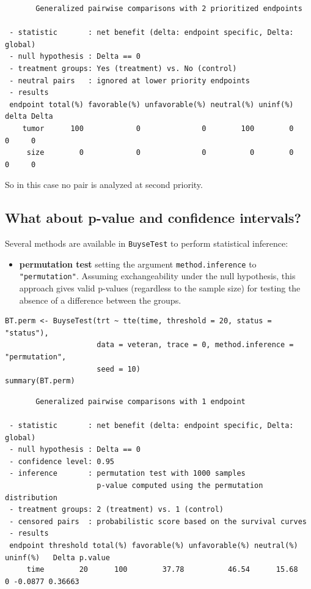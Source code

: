 \documentclass[12pt]{article}
\begin{document}
\begin{verbatim}
       Generalized pairwise comparisons with 2 prioritized endpoints

 - statistic       : net benefit (delta: endpoint specific, Delta: global) 
 - null hypothesis : Delta == 0 
 - treatment groups: Yes (treatment) vs. No (control) 
 - neutral pairs   : ignored at lower priority endpoints
 - results
 endpoint total(%) favorable(%) unfavorable(%) neutral(%) uninf(%) delta Delta
    tumor      100            0              0        100        0     0     0
     size        0            0              0          0        0     0     0
\end{verbatim}

So in this case no pair is analyzed at second priority.

\clearpage

\subsection{What about p-value and confidence intervals?}
\label{sec:org1fc7a9e}

Several methods are available in \texttt{BuyseTest} to perform statistical inference:
\begin{itemize}
\item \textbf{permutation test} setting the argument \texttt{method.inference} to
\texttt{"permutation"}. Assuming exchangeability under the null hypothesis,
this approach gives valid p-values (regardless to the sample size)
for testing the absence of a difference between the groups.
\end{itemize}
\lstset{language=r,label= ,caption= ,captionpos=b,numbers=none}
\begin{lstlisting}
BT.perm <- BuyseTest(trt ~ tte(time, threshold = 20, status = "status"),
                     data = veteran, trace = 0, method.inference = "permutation",
                     seed = 10) 
summary(BT.perm)
\end{lstlisting}

\begin{verbatim}
       Generalized pairwise comparisons with 1 endpoint

 - statistic       : net benefit (delta: endpoint specific, Delta: global) 
 - null hypothesis : Delta == 0 
 - confidence level: 0.95 
 - inference       : permutation test with 1000 samples 
                     p-value computed using the permutation distribution 
 - treatment groups: 2 (treatment) vs. 1 (control) 
 - censored pairs  : probabilistic score based on the survival curves
 - results
 endpoint threshold total(%) favorable(%) unfavorable(%) neutral(%) uninf(%)   Delta p.value 
     time        20      100        37.78          46.54      15.68        0 -0.0877 0.36663
\end{verbatim}
\end{document}
